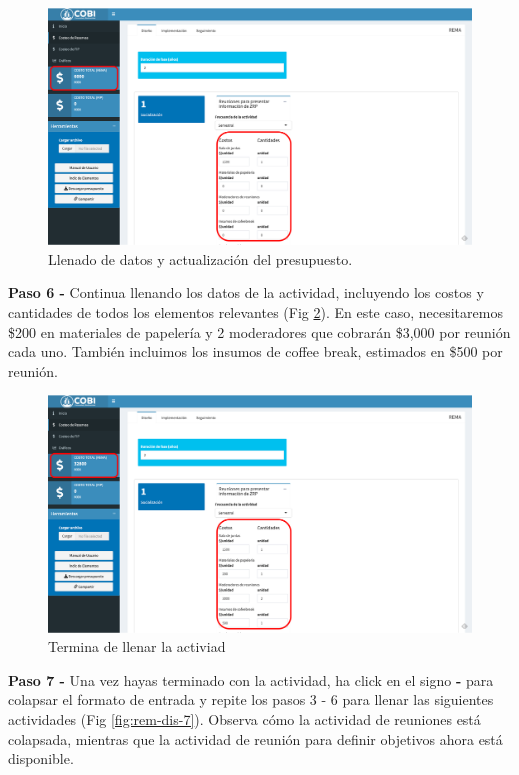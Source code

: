 \documentclass[
]{book}
\begin{document}
\begin{figure}
\includegraphics[width=61.11in]{images/rema_dis_5} \caption{Llenado de datos y actualización del presupuesto.}\label{fig:rem-dis-5}
\end{figure}

\textbf{Paso 6 - } Continua llenando los datos de la actividad, incluyendo los costos y cantidades de todos los elementos relevantes (Fig \ref{fig:rem-dis-6}). En este caso, necesitaremos \$200 en materiales de papelería y 2 moderadores que cobrarán \$3,000 por reunión cada uno. También incluimos los insumos de coffee break, estimados en \$500 por reunión.

\begin{figure}
\includegraphics[width=61.11in]{images/rema_dis_6} \caption{Termina de llenar la activiad}\label{fig:rem-dis-6}
\end{figure}

\textbf{Paso 7 - } Una vez hayas terminado con la actividad, ha click en el signo \textbf{-} para colapsar el formato de entrada y repite los pasos 3 - 6 para llenar las siguientes actividades (Fig \ref{fig:rem-dis-7}). Observa cómo la actividad de reuniones está colapsada, mientras que la actividad de reunión para definir objetivos ahora está disponible.
\end{document}
